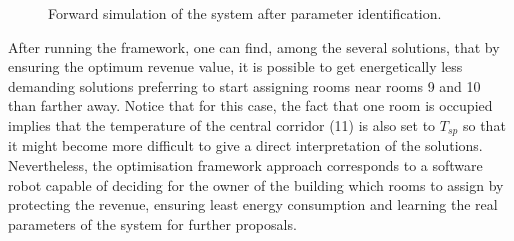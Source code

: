     \begin{figure}[thpb]
    	\centering
    	\caption{Forward simulation of the system after parameter identification.}
    	\label{fig:smallhotel}
    \end{figure} 
    
After running the framework, one can find, among the several solutions, that by ensuring the optimum revenue value, it is possible to get energetically less demanding solutions preferring to start assigning rooms near rooms 9 and 10 than farther away. Notice that for this case, the fact that one room is occupied implies that the temperature of the central corridor (11) is also set to $T_{sp}$ so that it might become more difficult to give a direct interpretation of the solutions. Nevertheless, the optimisation framework approach corresponds to a software robot capable of deciding for the owner of the building which rooms to assign by protecting the revenue, ensuring least energy consumption and learning the real parameters of the system for further proposals.